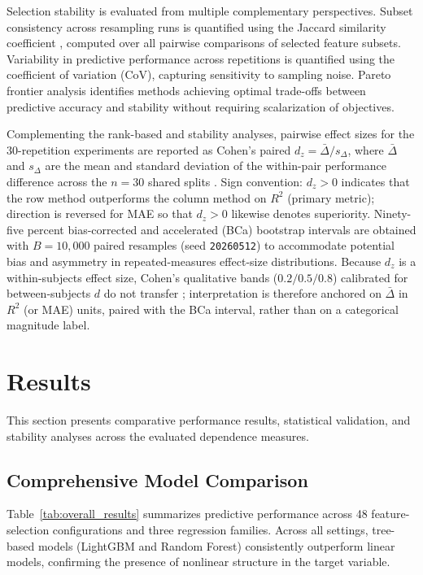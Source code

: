 \documentclass[twoside,11pt]{article}
\begin{document}
Selection stability is evaluated from multiple complementary perspectives.
Subset consistency across resampling runs is quantified using the Jaccard
similarity coefficient \citep{Nogueira2016jaccard}, computed over all pairwise
comparisons of selected feature subsets. Variability in predictive performance
across repetitions is quantified using the coefficient of variation (CoV),
capturing sensitivity to sampling noise. Pareto frontier analysis identifies
methods achieving optimal trade-offs between predictive accuracy and stability
without requiring scalarization of objectives.

Complementing the rank-based and stability analyses, pairwise effect sizes
for the 30-repetition experiments are reported as Cohen's paired
$d_z = \bar{\Delta} / s_{\Delta}$, where
$\bar{\Delta}$ and $s_{\Delta}$ are the mean and standard deviation of the
within-pair performance difference across the $n = 30$ shared splits
\citep{Cohen1988, Lakens2013}. Sign convention: $d_z > 0$ indicates that the
row method outperforms the column method on $R^{2}$ (primary metric);
direction is reversed for MAE so that $d_z > 0$ likewise denotes superiority.
Ninety-five percent bias-corrected and accelerated (BCa) bootstrap intervals
are obtained with $B = 10{,}000$ paired resamples (seed
\texttt{20260512}) to accommodate potential bias and asymmetry in
repeated-measures effect-size distributions. Because
$d_z$ is a within-subjects effect size, Cohen's qualitative bands
($0.2 / 0.5 / 0.8$) calibrated for between-subjects $d$ do not transfer
\citep{Lakens2013}; interpretation is therefore anchored on $\bar{\Delta}$ in
$R^{2}$ (or MAE) units, paired with the BCa interval, rather than on a
categorical magnitude label.

\section{Results}
This section presents comparative performance results, statistical validation, and stability analyses across the evaluated dependence measures.

\subsection{Comprehensive Model Comparison}

Table~\ref{tab:overall_results} summarizes predictive performance across 48 feature-selection configurations and three regression families. Across all settings, tree-based models (LightGBM and Random Forest) consistently outperform linear models, confirming the presence of nonlinear structure in the target variable.
\end{document}

